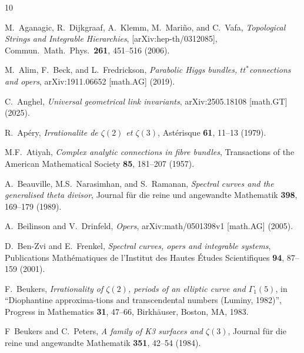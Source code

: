 \documentclass{amsart}
\theoremstyle{definition}
\numberwithin{equation}{section}
\numberwithin{figure}{section}
\def\Gam{\Gamma}
\begin{document}



\providecommand{\bysame}{\leavevmode\hbox to3em{\hrulefill}\thinspace}
\begin{thebibliography}{10}



M.~Aganagic, R.~Dijkgraaf, A.~Klemm,
M.~Mari\~no, and C.~Vafa,
\emph{Topological Strings and Integrable 
Hierarchies},
 	[arXiv:hep-th/0312085], 
Commun.\ Math.\ Phys.\
\textbf{261}, 451--516 (2006).

M.~Alim, F.~Beck, and L.~Fredrickson,
\emph{Parabolic Higgs bundles, $tt^*$connections and opers},
 	arXiv:1911.06652 [math.AG]  (2019).
	
	
C.~Anghel, 
\emph{Universal geometrical link invariants},
 	arXiv:2505.18108 [math.GT] (2025).


R.~Ap\'ery, 
\emph{Irrationalite de $\zeta(2)$ et $\zeta(3)$}, Ast\'erisque 
\textbf{61},  11--13 (1979).


M.F.~Atiyah,
\emph{Complex analytic connections in fibre bundles},
Transactions of the American Mathematical Society \textbf{85}, 181--207 (1957). 
 

A.~Beauville, M.S.~Narasimhan, and S.~Ramanan, 
\emph{Spectral curves and the generalised theta divisor},
Journal f\"ur die reine und angewandte Mathematik
\textbf{398}, 169--179 (1989).




 
 A.~Beilinson and V.~Drinfeld,
 \emph{Opers},
 arXiv:math/0501398v1 [math.AG] (2005).
 
 
 
 D.~Ben-Zvi and E.~Frenkel,
 \emph{Spectral curves, opers and integrable 
 systems},
Publications Math\'ematiques de l'Institut des Hautes \'Etudes Scientifiques \textbf{94}, 87--159 (2001).

F.~Beukers, 
\emph{Irrationality of $\zeta(2)$, periods of an elliptic curve and $\Gam_1(5)$}, 
in ``Diophantine approxima-tions and transcendental numbers (Luminy, 1982)'', Progress in Mathematics \textbf{31}, 47--66, Birkh\"auser, Boston, MA, 1983.

F~Beukers and C.~Peters, 
\emph{A family of K3 surfaces and $\zeta(3)$},
Journal f\"ur die reine und angewandte Mathematik \textbf{351}, 42--54 (1984).




\end{thebibliography}
\end{document}
